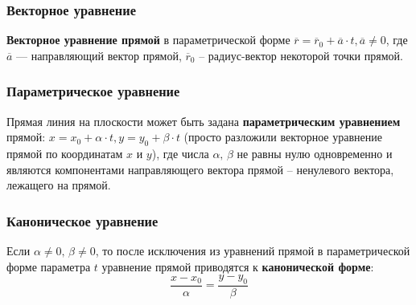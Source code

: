 \documentclass{article}
\begin{document}
\subsubsection{Векторное уравнение}
\textbf{Векторное уравнение прямой} в параметрической форме $\overline{r} = \overline{r}_0 + \overline{a}\cdot t, \overline{a} \neq 0$, где $\overline{a}$ — направляющий вектор прямой, $\overline{r}_0$ -- радиус-вектор некоторой точки прямой.
\subsubsection{Параметрическое уравнение}
Прямая линия на плоскости может быть задана \textbf{параметрическим уравнением} прямой: $x = x_0 + \alpha\cdot t, y = y_0 + \beta\cdot t$ (просто разложили векторное уравнение прямой по координатам $x$ и $y$), где числа $\alpha,\,\beta$ не равны нулю одновременно и являются компонентами направляющего вектора прямой -- ненулевого вектора, лежащего на прямой.
\subsubsection{Каноническое уравнение}
Если $\alpha\neq0,\,\beta\neq0$, то после исключения из уравнений прямой в параметрической форме параметра $t$ уравнение прямой приводятся к \textbf{канонической форме}:
$$ \frac{x-x_0}{\alpha}=\frac{y-y_0}{\beta} $$
\end{document}
